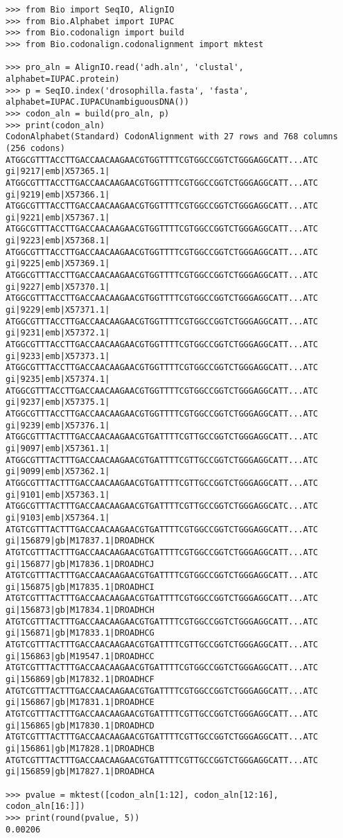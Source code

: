 \begin{verbatim}
>>> from Bio import SeqIO, AlignIO
>>> from Bio.Alphabet import IUPAC
>>> from Bio.codonalign import build
>>> from Bio.codonalign.codonalignment import mktest

>>> pro_aln = AlignIO.read('adh.aln', 'clustal', alphabet=IUPAC.protein)
>>> p = SeqIO.index('drosophilla.fasta', 'fasta', alphabet=IUPAC.IUPACUnambiguousDNA())
>>> codon_aln = build(pro_aln, p)
>>> print(codon_aln)
CodonAlphabet(Standard) CodonAlignment with 27 rows and 768 columns (256 codons)
ATGGCGTTTACCTTGACCAACAAGAACGTGGTTTTCGTGGCCGGTCTGGGAGGCATT...ATC gi|9217|emb|X57365.1|
ATGGCGTTTACCTTGACCAACAAGAACGTGGTTTTCGTGGCCGGTCTGGGAGGCATT...ATC gi|9219|emb|X57366.1|
ATGGCGTTTACCTTGACCAACAAGAACGTGGTTTTCGTGGCCGGTCTGGGAGGCATT...ATC gi|9221|emb|X57367.1|
ATGGCGTTTACCTTGACCAACAAGAACGTGGTTTTCGTGGCCGGTCTGGGAGGCATT...ATC gi|9223|emb|X57368.1|
ATGGCGTTTACCTTGACCAACAAGAACGTGGTTTTCGTGGCCGGTCTGGGAGGCATT...ATC gi|9225|emb|X57369.1|
ATGGCGTTTACCTTGACCAACAAGAACGTGGTTTTCGTGGCCGGTCTGGGAGGCATT...ATC gi|9227|emb|X57370.1|
ATGGCGTTTACCTTGACCAACAAGAACGTGGTTTTCGTGGCCGGTCTGGGAGGCATT...ATC gi|9229|emb|X57371.1|
ATGGCGTTTACCTTGACCAACAAGAACGTGGTTTTCGTGGCCGGTCTGGGAGGCATT...ATC gi|9231|emb|X57372.1|
ATGGCGTTTACCTTGACCAACAAGAACGTGGTTTTCGTGGCCGGTCTGGGAGGCATT...ATC gi|9233|emb|X57373.1|
ATGGCGTTTACCTTGACCAACAAGAACGTGGTTTTCGTGGCCGGTCTGGGAGGCATT...ATC gi|9235|emb|X57374.1|
ATGGCGTTTACCTTGACCAACAAGAACGTGGTTTTCGTGGCCGGTCTGGGAGGCATT...ATC gi|9237|emb|X57375.1|
ATGGCGTTTACCTTGACCAACAAGAACGTGGTTTTCGTGGCCGGTCTGGGAGGCATT...ATC gi|9239|emb|X57376.1|
ATGGCGTTTACTTTGACCAACAAGAACGTGATTTTCGTTGCCGGTCTGGGAGGCATT...ATC gi|9097|emb|X57361.1|
ATGGCGTTTACTTTGACCAACAAGAACGTGATTTTCGTTGCCGGTCTGGGAGGCATT...ATC gi|9099|emb|X57362.1|
ATGGCGTTTACTTTGACCAACAAGAACGTGATTTTCGTTGCCGGTCTGGGAGGCATT...ATC gi|9101|emb|X57363.1|
ATGGCGTTTACTTTGACCAACAAGAACGTGATTTTCGTTGCCGGTCTGGGAGGCATC...ATC gi|9103|emb|X57364.1|
ATGTCGTTTACTTTGACCAACAAGAACGTGATTTTCGTGGCCGGTCTGGGAGGCATT...ATC gi|156879|gb|M17837.1|DROADHCK
ATGTCGTTTACTTTGACCAACAAGAACGTGATTTTCGTGGCCGGTCTGGGAGGCATT...ATC gi|156877|gb|M17836.1|DROADHCJ
ATGTCGTTTACTTTGACCAACAAGAACGTGATTTTCGTGGCCGGTCTGGGAGGCATT...ATC gi|156875|gb|M17835.1|DROADHCI
ATGTCGTTTACTTTGACCAACAAGAACGTGATTTTCGTGGCCGGTCTGGGAGGCATT...ATC gi|156873|gb|M17834.1|DROADHCH
ATGTCGTTTACTTTGACCAACAAGAACGTGATTTTCGTGGCCGGTCTGGGAGGCATT...ATC gi|156871|gb|M17833.1|DROADHCG
ATGTCGTTTACTTTGACCAACAAGAACGTGATTTTCGTTGCCGGTCTGGGAGGCATT...ATC gi|156863|gb|M19547.1|DROADHCC
ATGTCGTTTACTTTGACCAACAAGAACGTGATTTTCGTGGCCGGTCTGGGAGGCATT...ATC gi|156869|gb|M17832.1|DROADHCF
ATGTCGTTTACTTTGACCAACAAGAACGTGATTTTCGTGGCCGGTCTGGGAGGCATT...ATC gi|156867|gb|M17831.1|DROADHCE
ATGTCGTTTACTTTGACCAACAAGAACGTGATTTTCGTTGCCGGTCTGGGAGGCATT...ATC gi|156865|gb|M17830.1|DROADHCD
ATGTCGTTTACTTTGACCAACAAGAACGTGATTTTCGTTGCCGGTCTGGGAGGCATT...ATC gi|156861|gb|M17828.1|DROADHCB
ATGTCGTTTACTTTGACCAACAAGAACGTGATTTTCGTTGCCGGTCTGGGAGGCATT...ATC gi|156859|gb|M17827.1|DROADHCA

>>> pvalue = mktest([codon_aln[1:12], codon_aln[12:16], codon_aln[16:]])
>>> print(round(pvalue, 5))
0.00206
\end{verbatim}

